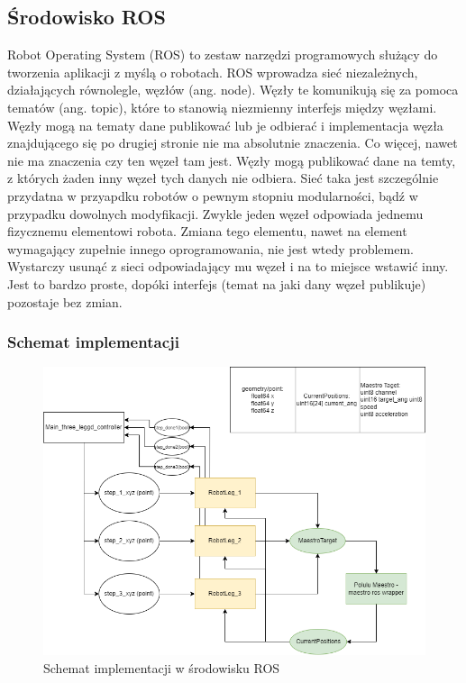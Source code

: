 \documentclass[a4paper,13pt]{article}
\begin{document}
\subsection{Środowisko ROS \cite{ROS_docs}}
Robot Operating System (ROS) to zestaw narzędzi programowych służący do tworzenia aplikacji z myślą o robotach. ROS wprowadza sieć niezależnych, działających równolegle, węzłów (ang. node). Węzły te komunikują się za pomoca tematów (ang. topic), które to stanowią niezmienny interfejs między węzłami. 
Węzły mogą na tematy dane publikować lub je odbierać i implementacja węzła znajdującego się po drugiej stronie nie ma absolutnie znaczenia. Co więcej, nawet nie ma znaczenia czy ten węzeł tam jest. Węzły mogą publikować dane na temty, z których żaden inny węzeł tych danych nie odbiera. Sieć taka jest szczególnie przydatna w przyapdku robotów o pewnym stopniu modularności, bądź w przypadku dowolnych modyfikacji. Zwykle jeden węzeł odpowiada jednemu fizycznemu elementowi robota. Zmiana tego elementu, nawet na element wymagający zupełnie innego oprogramowania, nie jest wtedy problemem. Wystarczy usunąć z sieci odpowiadający mu węzeł i na to miejsce wstawić inny. Jest to bardzo proste, dopóki interfejs (temat na jaki dany węzeł publikuje) pozostaje bez zmian.
\subsubsection{Schemat implementacji}
\begin{figure}[H]
\includegraphics[width=\textwidth]{img/implementation_schematic.png}
\caption{Schemat implementacji w środowisku ROS}
\label{ros_implementation_schematic}
\end{figure}
\end{document}
